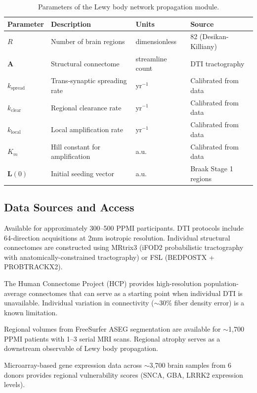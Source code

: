 \begin{table}[h]
\centering
\caption{Parameters of the Lewy body network propagation module.}
\label{tab:prop-params}
\small
\begin{tabular}{llll}
\toprule
\textbf{Parameter} & \textbf{Description} & \textbf{Units} & \textbf{Source} \\
\midrule
$R$ & Number of brain regions & dimensionless & 82 (Desikan-Killiany) \\
$\mathbf{A}$ & Structural connectome & streamline count & DTI tractography \\
$k_\text{spread}$ & Trans-synaptic spreading rate & yr$^{-1}$ & Calibrated from data \\
$k_\text{clear}$ & Regional clearance rate & yr$^{-1}$ & Calibrated from data \\
$k_\text{local}$ & Local amplification rate & yr$^{-1}$ & Calibrated from data \\
$K_m$ & Hill constant for amplification & a.u. & Calibrated from data \\
$\mathbf{L}(0)$ & Initial seeding vector & a.u. & Braak Stage 1 regions \\
\bottomrule
\end{tabular}
\end{table}

\subsection{Data Sources and Access}

\begin{description}[style=nextline]
\item[DTI Tractography (PPMI)] Available for approximately 300--500 PPMI participants. DTI protocols include 64-direction acquisitions at 2mm isotropic resolution. Individual structural connectomes are constructed using MRtrix3 (iFOD2 probabilistic tractography with anatomically-constrained tractography) or FSL (BEDPOSTX + PROBTRACKX2).

\item[Population-Average Connectome] The Human Connectome Project (HCP) provides high-resolution population-average connectomes that can serve as a starting point when individual DTI is unavailable. Individual variation in connectivity ($\sim$30\% fiber density error) is a known limitation.

\item[FreeSurfer Volumetric Data (PPMI)] Regional volumes from FreeSurfer ASEG segmentation are available for $\sim$1,700 PPMI patients with 1--3 serial MRI scans. Regional atrophy serves as a downstream observable of Lewy body propagation.

\item[Allen Human Brain Atlas] Microarray-based gene expression data across $\sim$3,700 brain samples from 6 donors provides regional vulnerability scores (SNCA, GBA, LRRK2 expression levels).
\end{description}

